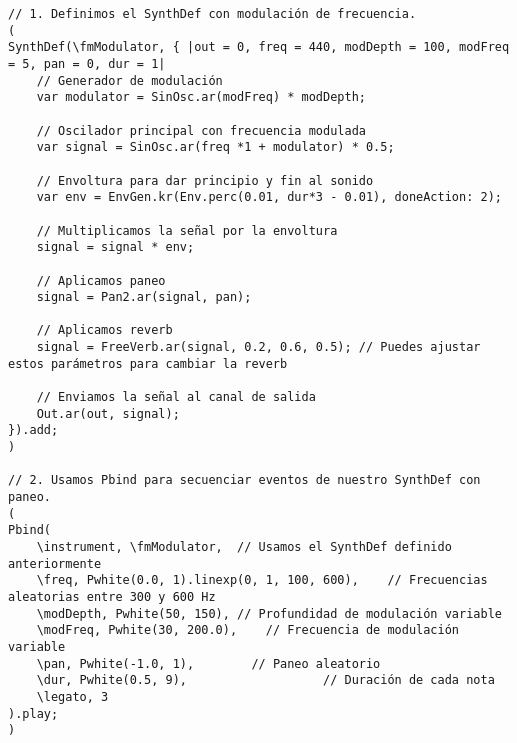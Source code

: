 \begin{minipage}[t]{1\textwidth}
    \centering
    \begin{lstlisting}[style=SuperCollider-IDE, basicstyle=\footnotesize\ttfamily, numbers=none]
// 1. Definimos el SynthDef con modulación de frecuencia.
(
SynthDef(\fmModulator, { |out = 0, freq = 440, modDepth = 100, modFreq = 5, pan = 0, dur = 1|
    // Generador de modulación
    var modulator = SinOsc.ar(modFreq) * modDepth;

    // Oscilador principal con frecuencia modulada
    var signal = SinOsc.ar(freq *1 + modulator) * 0.5;

    // Envoltura para dar principio y fin al sonido
    var env = EnvGen.kr(Env.perc(0.01, dur*3 - 0.01), doneAction: 2);

    // Multiplicamos la señal por la envoltura
    signal = signal * env;

    // Aplicamos paneo
    signal = Pan2.ar(signal, pan);

    // Aplicamos reverb
    signal = FreeVerb.ar(signal, 0.2, 0.6, 0.5); // Puedes ajustar estos parámetros para cambiar la reverb

    // Enviamos la señal al canal de salida
    Out.ar(out, signal);
}).add;
)

// 2. Usamos Pbind para secuenciar eventos de nuestro SynthDef con paneo.
(
Pbind(
    \instrument, \fmModulator,  // Usamos el SynthDef definido anteriormente
    \freq, Pwhite(0.0, 1).linexp(0, 1, 100, 600),    // Frecuencias aleatorias entre 300 y 600 Hz
    \modDepth, Pwhite(50, 150), // Profundidad de modulación variable
    \modFreq, Pwhite(30, 200.0),    // Frecuencia de modulación variable
    \pan, Pwhite(-1.0, 1),        // Paneo aleatorio
    \dur, Pwhite(0.5, 9),                   // Duración de cada nota
    \legato, 3
).play;
)           
    \end{lstlisting}
    \vspace{1cm}
\end{minipage}








